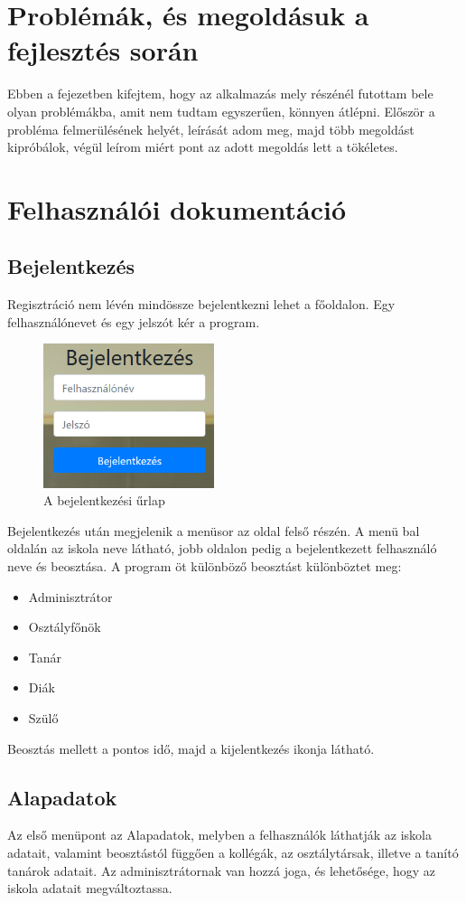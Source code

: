 \documentclass[
]{thesis-ekf}
\begin{document}
\chapter{Problémák, és megoldásuk a fejlesztés során}
Ebben a fejezetben kifejtem, hogy az alkalmazás mely részénél futottam bele olyan problémákba, amit nem tudtam egyszerűen, könnyen átlépni. Először a probléma felmerülésének helyét, leírását adom meg, majd több megoldást kipróbálok, végül leírom miért pont az adott megoldás lett a tökéletes.
\chapter{Felhasználói dokumentáció}
\section{Bejelentkezés}
Regisztráció nem lévén mindössze bejelentkezni lehet a főoldalon. Egy felhasználónevet és egy jelszót kér a program.
\begin{figure}[ht]
	\centering
	\includegraphics[width=5cm]{kepek/bejelentkezes}
	\caption{A bejelentkezési űrlap}
	\label{fig:bejelentkezes}
\end{figure}
Bejelentkezés után megjelenik a menüsor az oldal felső részén. A menü bal oldalán az iskola neve látható, jobb oldalon pedig a bejelentkezett felhasználó neve és beosztása. A program öt különböző beosztást különböztet meg:
\begin{itemize}
	\item Adminisztrátor
	\item Osztályfőnök
	\item Tanár
	\item Diák
	\item Szülő
\end{itemize}
Beosztás mellett a pontos idő, majd a kijelentkezés ikonja látható.
\section{Alapadatok}
Az első menüpont az Alapadatok, melyben a felhasználók láthatják az iskola adatait, valamint beosztástól függően a kollégák, az osztálytársak, illetve a tanító tanárok adatait. Az adminisztrátornak van hozzá joga, és lehetősége, hogy az iskola adatait megváltoztassa.
\end{document}
